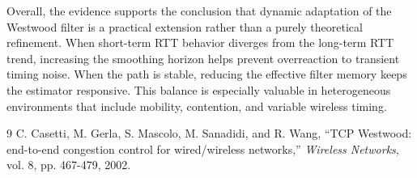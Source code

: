 \documentclass[conference,10pt,a4paper]{IEEEtran}
\begin{document}
Overall, the evidence supports the conclusion that dynamic adaptation of the Westwood filter is a practical extension rather than a purely theoretical refinement. When short-term RTT behavior diverges from the long-term RTT trend, increasing the smoothing horizon helps prevent overreaction to transient timing noise. When the path is stable, reducing the effective filter memory keeps the estimator responsive. This balance is especially valuable in heterogeneous environments that include mobility, contention, and variable wireless timing.


\begin{thebibliography}{9}
C. Casetti, M. Gerla, S. Mascolo, M. Sanadidi, and R. Wang, ``TCP Westwood: end-to-end congestion control for wired/wireless networks,'' \textit{Wireless Networks}, vol. 8, pp. 467-479, 2002.
\end{thebibliography}
\end{document}
